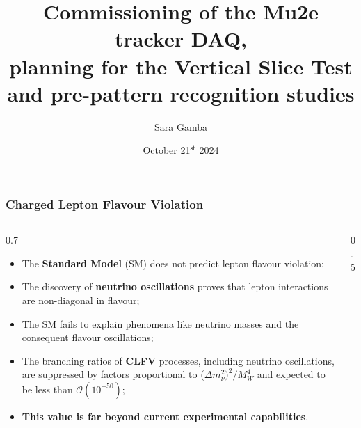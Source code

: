 \documentclass{beamer}
\title[Titolo breve]{Commissioning of the Mu2e tracker DAQ,\\ \vspace{1mm}planning for the Vertical Slice Test\\\vspace{1mm}and pre-pattern recognition studies}
\institute{Università di Pisa}
\author[Sara Gamba]{\small{Sara Gamba}}
\date[21/10/24]{\small{October 21$^{\text{st}}$ 2024}}
\begin{document}
	
\begin{frame}
\setTitlestyleDissertation
\maketitle
\end{frame}


\begin{frame}
    \frametitle{Charged Lepton Flavour Violation}
    \vspace{-2mm}
\begin{columns}
    \begin{column}{0.7\framewidth}
        \begin{itemize}
            \item The \textbf{Standard Model} (SM) does not predict lepton flavour violation;
            \vspace{1mm}
            \item The discovery of \textbf{neutrino oscillations} proves that lepton interactions are non-diagonal in flavour; \textcolor{white}{\cite{Bernstein_2013} \cite{Kargiantoulakis_2020} \cite{universe9010054}}
            \vspace{1mm}
            \item The SM fails to explain phenomena like neutrino masses and the consequent flavour oscillations;\textcolor{white}{\cite{clfv_signorelli} \cite{bartoszek2015mu2e} \cite{bobbb} \cite{kola}}
            \vspace{1mm}
            \item The branching ratios of \textbf{CLFV}
            processes, including neutrino
            oscillations, are suppressed by factors
            proportional to ($\Delta m_\nu^2)^2 /M^4_W$ and expected to be less than $\mathcal{O}(10^{-50})$;
            \vspace{1mm}
            \item \textbf{This value is far beyond current experimental capabilities}.
        \end{itemize}
    \end{column}
    \begin{column}{0.5\framewidth}

\end{column}
\end{columns}
\end{frame}
\end{document}

